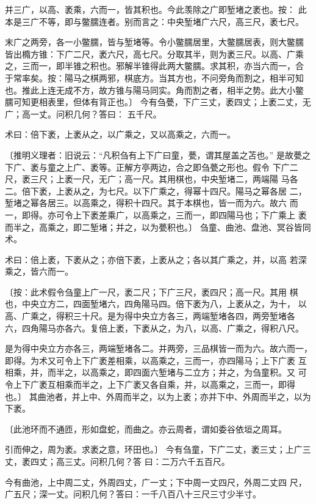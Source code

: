 \documentclass[12pt,UTF8]{ctexbook}
\begin{document}
并三广，以高、袤乘，六而一，皆其积也。今此羡除之广即堑堵之袤也。按： 此本是三广不等，即与鳖臑连者。别而言之：中央堑堵广六尺，高三尺，袤七尺。

末广之两旁，各一小鳖臑，皆与堑堵等。令小鳖臑居里，大鳖臑居表，则大鳖臑 皆出橢方锥：下广二尺，袤六尺，高七尺。分取其半，则为袤三尺。以高、广乘 之，三而一，即半锥之积也。邪解半锥得此两大鳖臑。求其积，亦当六而一，合 于常率矣。按：陽马之棋两邪，棋底方。当其方也，不问旁角而割之，相半可知 也。推此上连无成不方，故方锥与陽马同实。角而割之者，相半之势。此大小鳖 臑可知更相表里，但体有背正也。〕 今有刍甍，下广三丈，袤四丈；上袤二丈，无广；高一丈。问积几何？答曰： 五千尺。

术曰：倍下袤，上袤从之，以广乘之，又以高乘之，六而一。

〔推明义理者：旧说云：“凡积刍有上下广曰童，甍，谓其屋盖之苫也。” 是故甍之下广、袤与童之上广、袤等。正解方亭两边，合之即刍甍之形也。假令 下广二尺，袤三尺；上袤一尺，无广；高一尺。其用棋也，中央堑堵二，两端陽 马各二。倍下袤，上袤从之，为七尺。以下广乘之，得幂十四尺。陽马之幂各居 二，堑堵之幂各居三。以高乘之，得积十四尺。其于本棋也，皆一而为六。故六 而一，即得。亦可令上下袤差乘广，以高乘之，三而一，即四陽马也；下广乘上 袤而半之，高乘之，即二堑堵；并之，以为甍积也。〕 刍童、曲池、盘池、冥谷皆同术。

术曰：倍上袤，下袤从之；亦倍下袤，上袤从之；各以其广乘之，并，以高 若深乘之，皆六而一。

〔按：此术假令刍童上广一尺，袤二尺；下广三尺，袤四尺；高一尺。其用 棋也，中央立方二，四面堑堵六，四角陽马四。倍下袤为八，上袤从之，为十， 以高、广乘之，得积三十尺。是为得中央立方各三，两端堑堵各四，两旁堑堵各 六，四角陽马亦各六。复倍上袤，下袤从之，为八，以高、广乘之，得积八尺。

是为得中央立方亦各三，两端堑堵各二。并两旁，三品棋皆一而为六。故六而一， 即得。为术又可令上下广袤差相乘，以高乘之，三而一，亦四陽马；上下广袤 互相乘，并，而半之，以高乘之，即四面六堑堵与二立方；并之，为刍童积。又 可令上下广袤互相乘而半之，上下广袤又各自乘，并，以高乘之，三而一，即得 也。〕 其曲池者，并上中、外周而半之，以为上袤；亦并下中、外周而半之，以为 下袤。

〔此池环而不通匝，形如盘蛇，而曲之。亦云周者，谓如委谷依垣之周耳。

引而伸之，周为袤。求袤之意，环田也。〕 今有刍童，下广二丈，袤三丈；上广三丈，袤四丈；高三丈。问积几何？答 曰：二万六千五百尺。

今有曲池，上中周二丈，外周四丈，广一丈；下中周一丈四尺，外周二丈四 尺，广五尺；深一丈。问积几何？答曰：一千八百八十三尺三寸少半寸。
\end{document}

